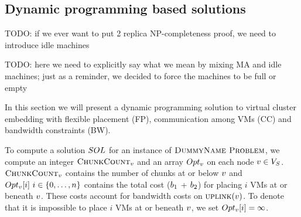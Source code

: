 \subsection{Dynamic programming based solutions}

TODO: if we ever want to put 2 replica NP-completeness proof, we need to introduce idle machines

TODO: here we need to explicitly say what we mean by mixing MA and idle machines; just as a reminder, we decided to force the machines to be full or empty

In this section we will present a dynamic programming solution to
virtual cluster embedding with flexible placement (FP), communication
among VMs (CC) and bandwidth constraints (BW).


\newcommand{\Opt}{\ensuremath{Opt}}
\newcommand{\Children}{\ensuremath{children}}

\newcommand{\Uplink}{\ensuremath{\textsc{uplink}}}
\newcommand{\ChunkCount}{\ensuremath{\textsc{ChunkCount}}}


To compute a solution $SOL$ for an instance of $\textsc{DummyName Problem}$, we compute an 
integer $\ChunkCount_\SubstrateNode$ and an array 
$\Opt_\SubstrateNode$ on each node $v \in 
V_S$. $\ChunkCount_\SubstrateNode$ contains the number of chunks at 
or below 
$v$ and $\Opt_\SubstrateNode[i]~i\in \{0,\dots,\Vms\}$ contains the 
total cost ($b_1$ + $b_2$) for placing $i$ VMs at or beneath 
$v$. These costs account for bandwidth costs on 
$\Uplink(\SubstrateNode)$. To denote that it is impossible to place $i$ VMs at 
or beneath $v$, we set $\Opt_\SubstrateNode[i] = \infty$.


